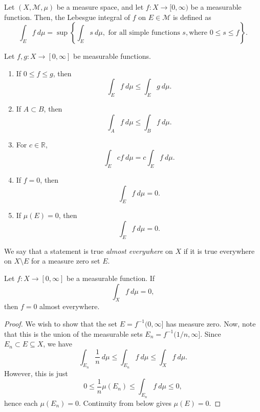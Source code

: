 \documentclass[11pt]{article}
\newcommand{\R}{\mathbb{R}}
\newcommand{\M}{\mathcal{M}}
\theoremstyle{definition}
\theoremstyle{remark}
\numberwithin{equation}{section}
\begin{document}
    \begin{definition}
        Let $(X, \M, \mu)$ be a measure space, and let $f\colon X \to [0, \infty)$ be
        a measurable function. Then, the Lebesgue integral of $f$ on $E \in \M$ is
        defined as \[ 
            \int_E f\:d\mu = \sup\left\{\int_E s\:d\mu, \text{ for all simple
            functions }s, \text{where }0 \leq s \leq f\right\}.
        \] 
    \end{definition}

    \begin{theorem}
        Let $f, g\colon X \to [0, \infty]$ be measurable functions.
        \begin{enumerate}
            \item If $0 \leq f \leq g$, then \[
                \int_E f\:d\mu \leq \int_E g\:d\mu.
            \] 
            \item If $A \subset B$, then \[
                \int_A f\:d\mu \leq \int_B f\:d\mu.
            \] 
            \item For $c \in \R$, \[
                \int_E cf\:d\mu = c\int_E f\:d\mu.
            \] 
            \item If $f = 0$, then \[
                \int_E f\:d\mu = 0.
            \] 
            \item If $\mu(E) = 0$, then \[
                \int_E f\:d\mu = 0.
            \] 
        \end{enumerate}
    \end{theorem}

    \begin{definition}
        We say that a statement is true \emph{almost everywhere} on $X$ if it is true
        everywhere on $X\setminus E$ for a measure zero set $E$.
    \end{definition}
    
    \begin{lemma}
        Let $f\colon X \to [0, \infty]$ be a measurable function. If \[
            \int_X f\:d\mu = 0,
        \] then $f = 0$ almost everywhere.
    \end{lemma}
    \begin{proof}
        We wish to show that the set $E = f^{-1}(0, \infty]$ has measure zero. Now,
        note that this is the union of the measurable sets $E_n = f^{-1}(1 / n,
        \infty]$. Since $E_n \subset E \subseteq X$, we have \[
            \int_{E_n} \frac{1}{n}\:d\mu \leq \int_{E_n} f\:d\mu \leq \int_X f\:d\mu.
        \] However, this is just \[
            0 \leq \frac{1}{n}\mu(E_n) \leq \int_{E_n} f\:d\mu \leq 0,
        \] hence each $\mu(E_n) = 0$. Continuity from below gives $\mu(E) = 0$.
    \end{proof}
\end{document}
